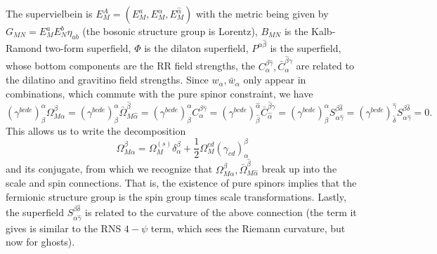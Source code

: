 \documentclass[12pt]{article}
\def\be{\begin{equation}}
\def\ee{\end{equation}}
\numberwithin{equation}{section}
\begin{document}
The supervielbein is $E^A_M = (E^a_M, E^\alpha_M, E^{\hat{\alpha}}_M)$ with the metric being given by $G_{MN} = E^a_M E^b_N \eta_{ab}$ (the bosonic structure group is Lorentz), $B_{MN}$ is the Kalb-Ramond two-form superfield, $\Phi$ is the dilaton superfield, $P^{\alpha \hat{\beta}}$ is the superfield, whose bottom components are the RR field strengths, the $C_\alpha^{\beta \hat{\gamma}}, \bar{C}_\alpha^{\hat{\beta}\gamma}$ are related to the dilatino and gravitino field strengths.  Since $w_\alpha, \bar{w}_{\hat{\alpha}}$ only appear in combinations, which commute with the pure spinor constraint, we have
\be
(\gamma^{bcde})^\alpha_\beta \Omega_{M\alpha}^\beta = (\gamma^{bcde})^\alpha_\beta \bar{\Omega}_{M\hat{\alpha}}^{\hat{\beta}} =  (\gamma^{bcde})^\alpha_\beta C_\alpha^{\beta \hat{\gamma}} = (\gamma^{bcde})^{\hat{\alpha}}_{\hat{\beta}} \bar{C}_{\hat{\alpha}}^{\hat{\beta}\gamma} = (\gamma^{bcde})^\alpha_\beta S^{\beta \hat{\delta}}_{\alpha \hat{\gamma}} = (\gamma^{bcde})^{\hat{\gamma}}_{\hat{\delta}} S^{\beta \hat{\delta}}_{\alpha \hat{\gamma}} = 0.
\ee
This allows us to write the decomposition
\be
\Omega_{M\alpha}^\beta = \Omega^{(s)}_M \delta^\beta_\alpha + \frac{1}{2}\Omega^{cd}_M (\gamma_{cd})_\alpha^\beta
\ee
and its conjugate, from which we recognize that $\Omega_{M\alpha}^\beta, \bar{\Omega}^{\hat{\beta}}_{M\hat{\alpha}}$ break up into the scale and spin connections. That is, the existence of pure spinors implies that the fermionic structure group is the spin group times scale transformations. Lastly, the superfield $S^{\beta \hat{\delta}}_{\alpha \hat{\gamma}}$ is related to the curvature of the above connection (the term it gives is similar to the RNS $4-\psi$ term, which sees the Riemann curvature, but now for ghosts).
\end{document}
